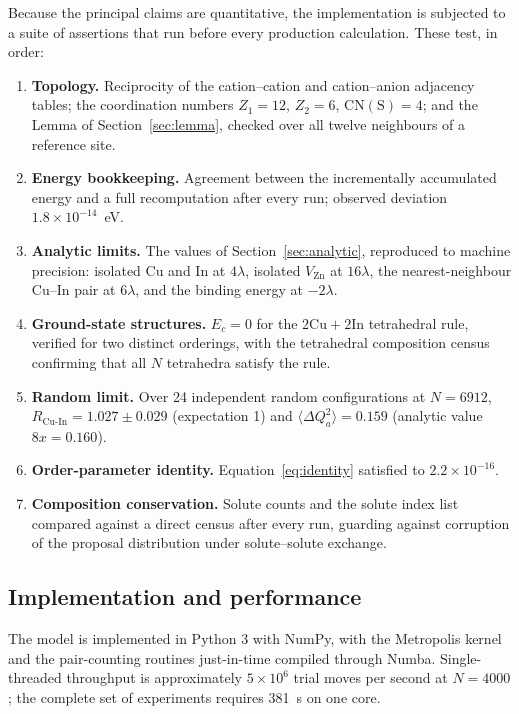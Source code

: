 \documentclass[11pt,a4paper]{article}
\newcommand{\dQ}{\Delta Q}
\newcommand{\RCuIn}{R_{\mathrm{Cu\text{-}In}}}
\begin{document}
Because the principal claims are quantitative, the implementation is subjected
to a suite of assertions that run before every production calculation. These
test, in order:
\begin{enumerate}\itemsep1pt
\item \textbf{Topology.} Reciprocity of the cation--cation and cation--anion
      adjacency tables; the coordination numbers $Z_1 = 12$, $Z_2 = 6$,
      $\mathrm{CN(S)} = 4$; and the Lemma of Section~\ref{sec:lemma}, checked
      over all twelve neighbours of a reference site.
\item \textbf{Energy bookkeeping.} Agreement between the incrementally
      accumulated energy and a full recomputation after every run; observed
      deviation $1.8 \times 10^{-14}$~eV.
\item \textbf{Analytic limits.} The values of Section~\ref{sec:analytic},
      reproduced to machine precision: isolated Cu and In at $4\lambda$,
      isolated $V_{\mathrm{Zn}}$ at $16\lambda$, the nearest-neighbour Cu--In
      pair at $6\lambda$, and the binding energy at $-2\lambda$.
\item \textbf{Ground-state structures.} $E_c = 0$ for the
      $2\mathrm{Cu}+2\mathrm{In}$ tetrahedral rule, verified for two distinct
      orderings, with the tetrahedral composition census confirming that all $N$
      tetrahedra satisfy the rule.
\item \textbf{Random limit.} Over 24 independent random configurations at
      $N = 6912$, $\RCuIn = 1.027 \pm 0.029$ (expectation 1) and
      $\langle \dQ_a^2 \rangle = 0.159$ (analytic value $8x = 0.160$).
\item \textbf{Order-parameter identity.} Equation~\eqref{eq:identity} satisfied
      to $2.2\times10^{-16}$.
\item \textbf{Composition conservation.} Solute counts and the solute index list
      compared against a direct census after every run, guarding against
      corruption of the proposal distribution under solute--solute exchange.
\end{enumerate}

\subsection{Implementation and performance}

The model is implemented in Python 3 with NumPy, with the Metropolis kernel and
the pair-counting routines just-in-time compiled through Numba. Single-threaded
throughput is approximately $5\times10^{6}$ trial moves per second at
$N = 4000$; the complete set of experiments requires 381~s on one core.
\end{document}
